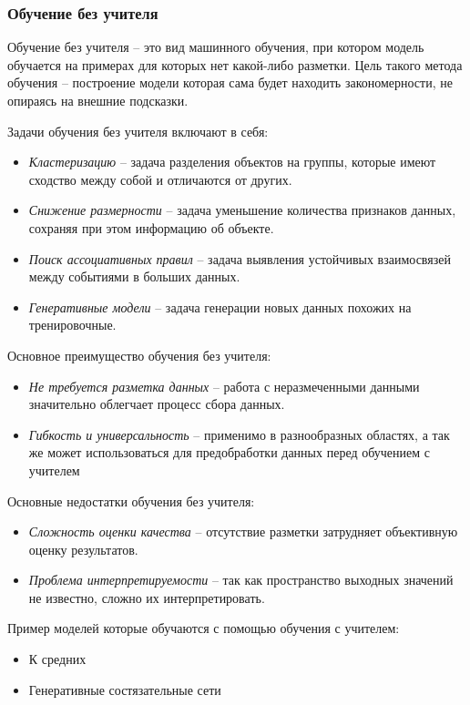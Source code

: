 \documentclass[../part_1.tex]{subfiles}
\begin{document}
\subsubsection{Обучение без учителя} 
    \label{sec:without_teacher}
    \par Обучение без учителя --  это вид машинного обучения, при котором модель обучается на примерах для которых нет какой-либо разметки. Цель такого метода обучения -- построение модели которая сама будет находить закономерности, не опираясь на внешние подсказки. 
    \par Задачи обучения без учителя включают в себя:
    \begin{itemize}
        \item \textit{Кластеризацию} -- задача разделения объектов на группы, которые имеют сходство между собой и отличаются от других.
        \item \textit{Снижение размерности} -- задача уменьшение количества признаков данных, сохраняя при этом информацию об объекте.
        \item \textit{Поиск ассоциативных правил} -- задача выявления устойчивых взаимосвязей между событиями в больших данных.
        \item \textit{Генеративные модели} -- задача генерации новых данных похожих на тренировочные.
    \end{itemize}
    \par Основное преимущество обучения без учителя:
    \begin{itemize}
        \item \textit{Не требуется разметка данных} -- работа с неразмеченными данными значительно облегчает процесс сбора данных.
        \item \textit{Гибкость и универсальность} -- применимо в разнообразных областях, а так же может использоваться для предобработки данных перед обучением с учителем
    \end{itemize}
    \par Основные недостатки обучения без учителя:
    \begin{itemize}
        \item \textit{Сложность оценки качества} -- отсутствие разметки затрудняет объективную оценку результатов.
        \item \textit{Проблема интерпретируемости} -- так как пространство выходных значений не известно, сложно их интерпретировать. 
    \end{itemize}
    \par Пример моделей которые обучаются с помощью обучения с учителем:
    \begin{itemize}
        \item К средних
        \item Генеративные состязательные сети
    \end{itemize}
\end{document}
